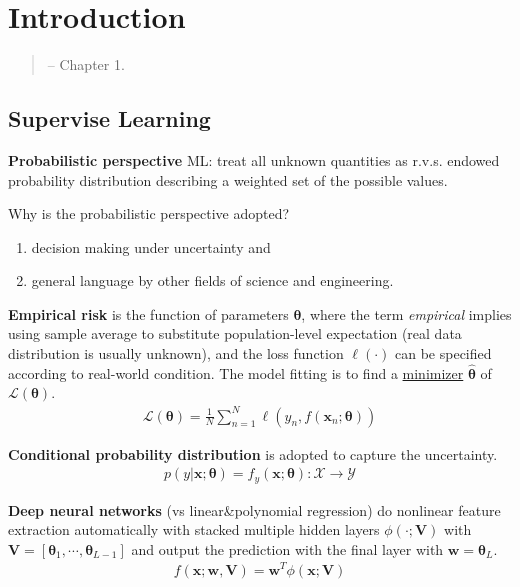 \section{Introduction}
\begin{quote}
    \citep{pml1Book} -- Chapter 1.
\end{quote}

\subsection{Supervise Learning}
\textbf{Probabilistic perspective} ML: treat all unknown quantities as r.v.s.
endowed probability distribution describing a weighted set of the possible values.

\begin{note}
    Why is the probabilistic perspective adopted?
    \begin{enumerate}
        \item decision making under uncertainty and
        \item general language by other fields of science and engineering.
    \end{enumerate}
\end{note}


\textbf{Empirical risk} is the function of parameters $\bm{\theta}$, 
where the term \textit{empirical} implies using sample average to substitute population-level expectation 
(real data distribution is usually unknown), 
and the loss function $\ell(\cdot)$ can be specified according to real-world condition.
The model fitting is to find a \underline{minimizer} $\hat{\bm{\theta}}$ of $\mathcal{L}(\bm{\theta})$.
\begin{gather}
    \mathcal{L}(\bm{\theta})=\frac{1}{N}\sum_{n=1}^N
    {\ell(y_n,f(\bm{x}_n;\bm{\theta}))}
\end{gather}

\textbf{Conditional probability distribution} is adopted to capture the uncertainty.
\begin{gather}
    p(y|\bm{x};\bm{\theta})
    =f_y(\bm{x};\bm{\theta}):\mathcal{X}\to\mathcal{Y}
\end{gather}

\textbf{Deep neural networks} (vs linear\&polynomial regression) do 
nonlinear feature extraction automatically with stacked multiple hidden layers $\phi(\cdot;\bm{V})$
with $\bm{V}=[\bm{\theta}_1,\cdots,\bm{\theta}_{L-1}]$ 
and output the prediction with the final layer with $\bm{w}=\bm{\theta}_L$.
\begin{gather}
    f(\bm{x};\bm{w},\bm{V})=\bm{w}^T\phi(\bm{x};\bm{V})
\end{gather}

